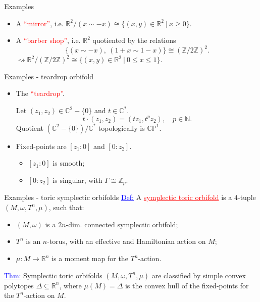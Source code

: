 \documentclass[aspectratio=169,xcolor=dvipsnames]{beamer}
\newcommand{\ra}{\rightarrow}
\newcommand{\NN}{\mathbb{N}}
\newcommand{\ZZ}{\mathbb{Z}}
\newcommand{\RR}{\mathbb{R}}
\newcommand{\CC}{\mathbb{C}}
\newcommand{\PP}{\mathbb{P}}
\newcommand{\w}{\omega}
\begin{document}
\begin{frame}{Examples}
	\begin{itemize}
		\item A \textcolor{red}{``mirror''}, i.e. $\RR^{2}/(x \sim -x) \cong \{(x,y) \in \RR^{2}\ |\ x \geq 0\}$.
		\hfill \break
		\item A \textcolor{red}{``barber shop''}, i.e. $\RR^{2}$ quotiented by the relations
		\[
		\{(x \sim -x),\ (1 + x \sim 1 - x)\} \cong (\ZZ/2\ZZ)^{2}.
		\]
		$\rightsquigarrow \RR^{2} / (\ZZ/2\ZZ)^{2} \cong \{(x,y) \in \RR^{2}\ |\ 0 \leq x \leq 1 \}$.
	\end{itemize}
\end{frame}

\begin{frame}{Examples - teardrop orbifold}
	\begin{itemize}
		\item The \textcolor{red}{``teardrop''}.
		
		Let $(z_{1}, z_{2}) \in \CC^{2} - \{0\}$ and $t \in \CC^{\ast}$.
		\[
		t \cdot (z_{1}, z_{2}) = (tz_{1}, t^{p}z_{2}), \quad p \in \NN.
		\]
		Quotient $\left(\CC^{2} - \{0\}\right)/\CC^{\ast}$ topologically is $\CC\PP^{1}$.
		\hfill \break
		\item Fixed-points are $[z_{1}:0]$ and $[0:z_{2}]$.
		\begin{itemize}
			\item $[z_{1}:0]$ is smooth;
			\item $[0:z_{2}]$ is singular, with $\Gamma \cong \ZZ_{p}$.
		\end{itemize}
	\end{itemize}
\end{frame}

\begin{frame}{Examples - toric symplectic orbifolds}
	\textcolor{blue}{\underline{Def:}} A \textcolor{red}{\underline{symplectic toric orbifold}} is a $4$-tuple $(M, \w, T^{n}, \mu)$, such that:
	\begin{itemize}
		\item $(M,\w)$ is a $2n$-dim. connected symplectic orbifold;
		\item $T^{n}$ is an $n$-torus, with an effective and Hamiltonian action on $M$;
		\item $\mu : M \ra \RR^{n}$ is a moment map for the $T^{n}$-action.
	\end{itemize}
	\hfill \break
	\textcolor{blue}{\underline{Thm:}} Symplectic toric orbifolds $(M, \w, T^{n}, \mu)$ are classified by simple convex polytopes $\Delta \subseteq \RR^{n}$, where $\mu(M) = \Delta$ is the convex hull of the fixed-points for the $T^{n}$-action on $M$.
\end{frame}
\end{document}
